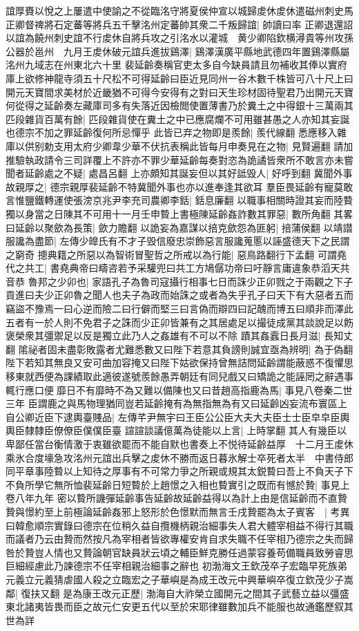 誼厚賚以悅之上屢遣中使諭之不從臨洺守將夏侯仲宣以城歸䖍休䖍休遣磁州刺史馬正卿督禆將石定蕃等將兵五千擊洺州定蕃帥其衆二千叛歸誼|{
	帥讀曰率}
正卿退還詔以誼為饒州刺史誼不行䖍休自將兵攻之引洺水以灌城　黄少卿陷欽横潯貴等州攻孫公器於邕州　九月王䖍休破元誼兵進拔鷄澤|{
	鷄澤漢廣平縣地武德四年置鷄澤縣屬洺州九域志在州東北六十里}
裴延齡奏稱官吏太多自今缺員請且勿補收其俸以實府庫上欲修神龍寺須五十尺松不可得延齡曰臣近見同州一谷木數千株皆可八十尺上曰開元天寶間求美材於近畿猶不可得今安得有之對曰天生珍材固待聖君乃出開元天寶何從得之延齡奏左藏庫司多有失落近因檢閲使置薄書乃於糞土之中得銀十三萬兩其匹段雜貨百萬有餘|{
	匹段雜貨使在糞土之中已應腐爛不可用雖甚愚之人亦知其妄誕也德宗不加之罪延齡復何所忌憚乎}
此皆已弃之物即是羨餘|{
	羨代線翻}
悉應移入雜庫以供别勅支用太府少卿韋少華不伏抗表稱此皆每月申奏見在之物|{
	見賢遍翻}
請加推驗執政請令三司詳覆上不許亦不罪少華延齡每奏對恣為詭譎皆衆所不敢言亦未嘗聞者延齡處之不疑|{
	處昌呂翻}
上亦頗知其誕妄但以其好詆毁人|{
	好呼到翻}
冀聞外事故親厚之|{
	德宗親厚裴延齡不特冀聞外事也亦以進奉逢其欲耳}
羣臣畏延齡有寵莫敢言惟鹽鐵轉運使張滂京兆尹李充司農卿李銛|{
	銛息廉翻}
以職事相關時證其妄而陸䞇獨以身當之日陳其不可用十一月壬申䞇上書極陳延齡姦詐數其罪惡|{
	數所角翻}
其畧曰延齡以聚歛為長策|{
	歛力贍翻}
以詭妄為嘉謀以掊克歛怨為匪躬|{
	掊蒲侯翻}
以靖譛服讒為盡節|{
	左傳少皥氏有不才子毁信廢忠崇飾惡言服讒蒐慝以誣盛德天下之民謂之窮奇}
摠典籍之所惡以為智術冒聖哲之所戒以為行能|{
	惡鳥路翻行下孟翻}
可謂堯代之共工|{
	書堯典帝曰疇咨若予采驩兜曰共工方鳩僝功帝曰吁靜言庸違象恭滔天共音恭}
魯邦之少卯也|{
	家語孔子為魯司寇攝行相事七日而誅少正卯戮之于兩觀之下子貢進曰夫少正卯魯之聞人也夫子為政而始誅之或者為失乎孔子曰天下有大惡者五而竊盜不豫焉一曰心逆而險二曰行僻而堅三曰言偽而辯四曰記醜而博五曰順非而澤此五者有一於人則不免君子之誅而少正卯皆兼有之其居處足以撮徒成黨其談說足以飭褒榮衆其彊禦足以反是獨立此乃人之姦雄有不可以不除}
蹟其姦蠧日長月滋|{
	長知丈翻}
隂祕者固未盡彰敗露者尤難悉數又曰陛下若意其負謗則誠宜亟為辨明|{
	為于偽翻}
陛下若知其無良又安可曲加容掩又曰陛下姑欲保持曾無詰問延齡謂能蔽惑不復懼思移東就西便為課績取此適彼遂號羨餘愚弄朝廷有同兒戲又曰矯詭之能誣罔之辭遇事輒行應口便靡日不有靡時不為又難以備陳也又曰昔趙高指鹿為馬|{
	事見八卷秦二世三年}
臣謂鹿之與馬物理猶同豈若延齡掩有為無指無為有又曰延齡凶妄流布寰區上自公卿近臣下逮輿臺賤品|{
	左傳芊尹無宇曰王臣公公臣大夫大夫臣士士臣皁皁臣輿輿臣隸隸臣僚僚臣僕僕臣臺}
諠諠談議億萬為徒能以上言|{
	上時掌翻}
其人有幾臣以卑鄙任當台衡情激于衷雖欲罷而不能自默也書奏上不悦待延齡益厚　十二月王䖍休乘氷合度壕急攻洺州元誼出兵擊之䖍休不勝而返日暮氷解士卒死者太半　中書侍郎同平章事陸䞇以上知待之厚事有不可常力爭之所親或規其太鋭䞇曰吾上不負天子下不負所學它無所恤裴延齡日短䞇於上趙憬之入相也䞇實引之既而有憾於贄|{
	事見上卷八年九年}
密以䞇所譏彈延齡事告延齡故延齡益得以為計上由是信延齡而不直贄贄與憬約至上前極論延齡姦邪上怒形於色憬默而無言壬戌贄罷為太子賓客　|{
	考異曰韓愈順宗實錄曰德宗在位稍久益自攬機柄親治細事失人君大體宰相益不得行其職而議者乃云由贄而然按凡為宰相者皆欲專權安肯自求失職不任宰相乃德宗之失而歸咎於贄豈人情也又贄論朝官缺員狀云頃之輔臣鮮克勝任過蒙容養苟備職員致勞睿思巨細經慮此乃諫德宗不任宰相親治細事之辭也}
初渤海文王欽茂卒子宏臨早死族弟元義立元義猜虐國人殺之立臨宏之子華嶼是為成王改元中興華嶼卒復立欽茂少子嵩鄰|{
	復扶又翻}
是為康王改元正歷|{
	渤海自大祚榮立國開元之間其子武藝立益以彊盛東北諸夷皆畏而臣之故元仁安更五代以至於宋耶律雖數加兵不能服也故通鑑歷叙其世為詳}


